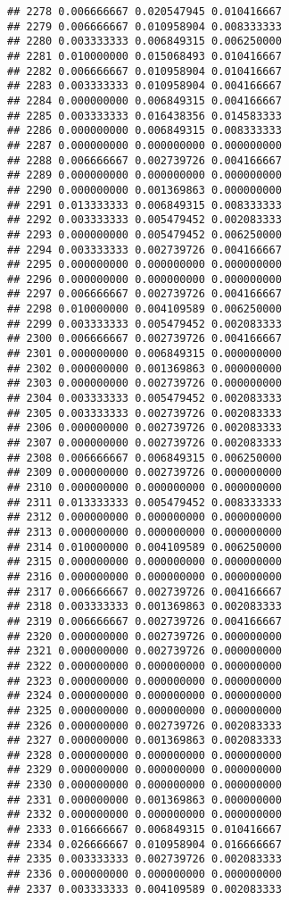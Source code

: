 \documentclass[
]{article}
\begin{document}
\begin{verbatim}
## 2278 0.006666667 0.020547945 0.010416667
## 2279 0.006666667 0.010958904 0.008333333
## 2280 0.003333333 0.006849315 0.006250000
## 2281 0.010000000 0.015068493 0.010416667
## 2282 0.006666667 0.010958904 0.010416667
## 2283 0.003333333 0.010958904 0.004166667
## 2284 0.000000000 0.006849315 0.004166667
## 2285 0.003333333 0.016438356 0.014583333
## 2286 0.000000000 0.006849315 0.008333333
## 2287 0.000000000 0.000000000 0.000000000
## 2288 0.006666667 0.002739726 0.004166667
## 2289 0.000000000 0.000000000 0.000000000
## 2290 0.000000000 0.001369863 0.000000000
## 2291 0.013333333 0.006849315 0.008333333
## 2292 0.003333333 0.005479452 0.002083333
## 2293 0.000000000 0.005479452 0.006250000
## 2294 0.003333333 0.002739726 0.004166667
## 2295 0.000000000 0.000000000 0.000000000
## 2296 0.000000000 0.000000000 0.000000000
## 2297 0.006666667 0.002739726 0.004166667
## 2298 0.010000000 0.004109589 0.006250000
## 2299 0.003333333 0.005479452 0.002083333
## 2300 0.006666667 0.002739726 0.004166667
## 2301 0.000000000 0.006849315 0.000000000
## 2302 0.000000000 0.001369863 0.000000000
## 2303 0.000000000 0.002739726 0.000000000
## 2304 0.003333333 0.005479452 0.002083333
## 2305 0.003333333 0.002739726 0.002083333
## 2306 0.000000000 0.002739726 0.002083333
## 2307 0.000000000 0.002739726 0.002083333
## 2308 0.006666667 0.006849315 0.006250000
## 2309 0.000000000 0.002739726 0.000000000
## 2310 0.000000000 0.000000000 0.000000000
## 2311 0.013333333 0.005479452 0.008333333
## 2312 0.000000000 0.000000000 0.000000000
## 2313 0.000000000 0.000000000 0.000000000
## 2314 0.010000000 0.004109589 0.006250000
## 2315 0.000000000 0.000000000 0.000000000
## 2316 0.000000000 0.000000000 0.000000000
## 2317 0.006666667 0.002739726 0.004166667
## 2318 0.003333333 0.001369863 0.002083333
## 2319 0.006666667 0.002739726 0.004166667
## 2320 0.000000000 0.002739726 0.000000000
## 2321 0.000000000 0.002739726 0.000000000
## 2322 0.000000000 0.000000000 0.000000000
## 2323 0.000000000 0.000000000 0.000000000
## 2324 0.000000000 0.000000000 0.000000000
## 2325 0.000000000 0.000000000 0.000000000
## 2326 0.000000000 0.002739726 0.002083333
## 2327 0.000000000 0.001369863 0.002083333
## 2328 0.000000000 0.000000000 0.000000000
## 2329 0.000000000 0.000000000 0.000000000
## 2330 0.000000000 0.000000000 0.000000000
## 2331 0.000000000 0.001369863 0.000000000
## 2332 0.000000000 0.000000000 0.000000000
## 2333 0.016666667 0.006849315 0.010416667
## 2334 0.026666667 0.010958904 0.016666667
## 2335 0.003333333 0.002739726 0.002083333
## 2336 0.000000000 0.000000000 0.000000000
## 2337 0.003333333 0.004109589 0.002083333

\end{verbatim}
\end{document}
